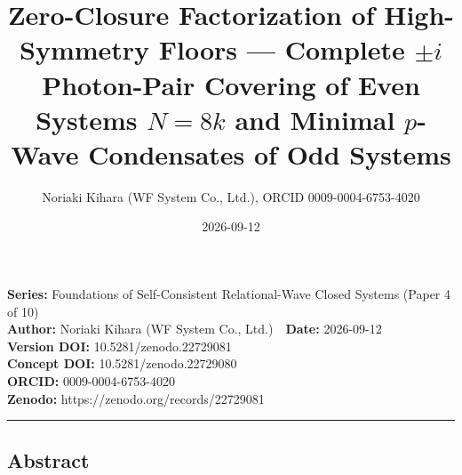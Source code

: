 \documentclass[
  a4paper,
]{ltjsarticle}
\title{Zero-Closure Factorization of High-Symmetry Floors --- Complete
\(\pm i\) Photon-Pair Covering of Even Systems \(N=8k\) and Minimal
\(p\)-Wave Condensates of Odd Systems}
\author{Noriaki Kihara (WF System Co., Ltd.), ORCID 0009-0004-6753-4020}
\date{2026-09-12}
\begin{document}
\maketitle

\textbf{Series:} Foundations of Self-Consistent Relational-Wave Closed
Systems (Paper 4 of 10)\\
\textbf{Author:} Noriaki Kihara (WF System Co., Ltd.)　\textbf{Date:}
2026-09-12\\
\textbf{Version DOI:} 10.5281/zenodo.22729081\\
\textbf{Concept DOI:} 10.5281/zenodo.22729080\\
\textbf{ORCID:} 0009-0004-6753-4020\\
\textbf{Zenodo:} https://zenodo.org/records/22729081\\

\begin{center}\rule{0.5\linewidth}{0.5pt}\end{center}

\subsection{Abstract}\label{abstract}
\end{document}
